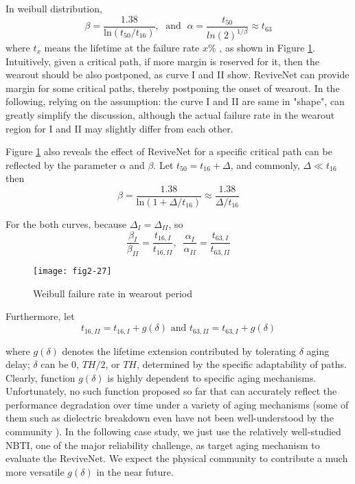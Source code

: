 In weibull distribution,
\begin{equation}\label{ab}
\beta=\frac{1.38}{\mbox{ln}(t_{50}/t_{16})},\;\mbox{ and }\; \alpha =
\frac{t_{50}}{ln(2)^{1/\beta}}\approx t_{63}
\end{equation}
where $t_x$ means the lifetime at the failure rate $x\%$ \cite{Handbook}, as shown in Figure \ref{weibull}. Intuitively, given a critical path, if more margin is reserved for it, then the wearout should be also postponed, as curve I and II show. ReviveNet can provide margin for some critical paths, thereby postponing the onset of wearout. In the following, relying on the assumption: the curve I and II are same in "shape", can greatly simplify the discussion, although the actual failure rate in the wearout region for I and II may slightly differ from each other.

Figure \ref{weibull} also reveals the effect of ReviveNet for a specific critical path can be reflected by the parameter $\alpha$ and $\beta$. Let $t_{50}= t_{16}+\Delta$, and commonly, $\Delta
\ll t_{16}$ then
\begin{equation}
  \beta=\frac{1.38}{\mbox{ln}(1+\Delta/t_{16})} \approx \frac{1.38}{\Delta/t_{16}}
\end{equation}

For the both curves, because $\Delta_I=\Delta_{II}$, so
\begin{equation}\label{frac}
\frac{\beta_I}{\beta_{II}}=
\frac{t_{16,I}}{t_{16,II}},\;\;\frac{\alpha_I}{\alpha_{II}}=\frac{t_{63,I}}{t_{63,II}}
\end{equation}


\begin{figure}[t]
\centering
\texttt{[image: fig2-27]}%
\vspace{-0.2cm}
   \caption{Weibull failure rate in wearout period}\label{weibull}
\end{figure}

Furthermore, let
\begin{equation}\label{newab}
t_{16,II}=t_{16,I}+g(\delta) \mbox{ and }  t_{63,II}=t_{63,I}+g(\delta)
\end{equation}

where $g(\delta)$ denotes the lifetime extension contributed by tolerating $\delta$ aging delay; $\delta$ can be $0$, $TH/2$, or $TH$, determined by the specific adaptability of paths. Clearly, function $g(\delta)$ is highly dependent to specific aging mechanisms. Unfortunately, no such function proposed so far that can accurately reflect the performance degradation over time under a variety of aging mechanisms (some of them such as dielectric breakdown even have not been well-understood by the community \cite{Reliability_limits_IBM02}). In the following case study, we just use the relatively well-studied NBTI, one of the major reliability challenge, as target aging mechanism to evaluate the ReviveNet. We expect the physical community to contribute a much more versatile $g(\delta)$ in the near future.

